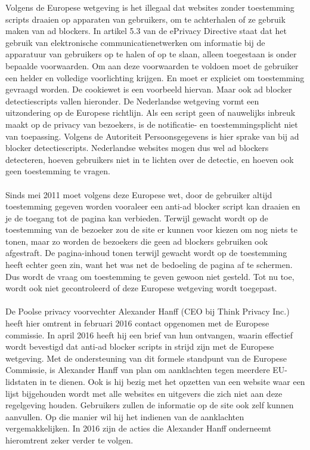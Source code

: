 \documentclass[pdftex,a4paper,12pt,twoside]{report}
\begin{document}
Volgens de Europese wetgeving is het illegaal dat websites zonder toestemming scripts draaien op apparaten van gebruikers, om te achterhalen of ze gebruik maken van ad blockers. 
In artikel 5.3 van de ePrivacy Directive staat dat het gebruik van elektronische communicatienetwerken om informatie bij de apparatuur van gebruikers op te halen of op te slaan, alleen toegestaan is onder bepaalde voorwaarden. Om aan deze voorwaarden te voldoen moet de gebruiker een helder en volledige voorlichting krijgen. En moet er expliciet om toestemming gevraagd worden. De cookiewet is een voorbeeld hiervan. Maar ook ad blocker detectiescripts vallen hieronder. De Nederlandse wetgeving vormt een uitzondering op de Europese richtlijn. Als een script geen of nauwelijks inbreuk maakt op de privacy van bezoekers, is de notificatie- en toestemmingsplicht niet van toepassing. Volgens de Autoriteit Persoonsgegevens is hier sprake van bij ad blocker detectiescripts. Nederlandse websites mogen dus wel ad blockers detecteren, hoeven gebruikers niet in te lichten over de detectie, en hoeven ook geen toestemming te vragen. 
\\
\\
Sinds mei 2011 moet volgens deze Europese wet, door de gebruiker altijd toestemming gegeven worden vooraleer een anti-ad blocker script kan draaien en je de toegang tot de pagina kan verbieden. Terwijl gewacht wordt op de toestemming van de bezoeker zou de site er kunnen voor kiezen om nog niets te tonen, maar zo worden de bezoekers die geen ad blockers gebruiken ook afgestraft. De pagina-inhoud tonen terwijl gewacht wordt op de toestemming heeft echter geen zin, want het was net de bedoeling de pagina af te schermen. Dus wordt de vraag om toestemming te geven gewoon niet gesteld. Tot nu toe, wordt ook niet gecontroleerd of deze Europese wetgeving wordt toegepast.
\\
\\
De Poolse privacy voorvechter Alexander Hanff (CEO bij Think Privacy Inc.) heeft hier omtrent in februari 2016 contact opgenomen met de Europese commissie. In april 2016 heeft hij een brief van hun ontvangen, waarin effectief wordt bevestigd dat anti-ad blocker scripts in strijd zijn met de Europese wetgeving. 
Met de ondersteuning van dit formele standpunt van de Europese Commissie, is Alexander Hanff van plan om aanklachten tegen meerdere EU-lidstaten in te dienen. Ook is hij bezig met het opzetten van een website waar een lijst bijgehouden wordt met alle websites en uitgevers die zich niet aan deze regelgeving houden. Gebruikers zullen de informatie op de site ook zelf kunnen aanvullen. Op die manier wil hij het indienen van de aanklachten vergemakkelijken.
In 2016 zijn de acties die Alexander Hanff onderneemt hieromtrent zeker verder te volgen.
\end{document}
